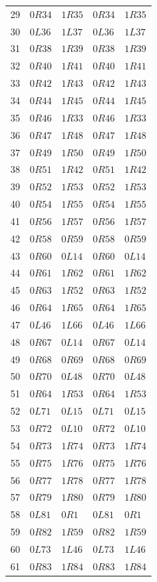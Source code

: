 {\begin{longtable}{@{}rllll@{}}
29 & $0R34$ & $1R35$ & $0R34$ & $1R35$\\
30 & $0L36$ & $1L37$ & $0L36$ & $1L37$\\
31 & $0R38$ & $1R39$ & $0R38$ & $1R39$\\
32 & $0R40$ & $1R41$ & $0R40$ & $1R41$\\
33 & $0R42$ & $1R43$ & $0R42$ & $1R43$\\
34 & $0R44$ & $1R45$ & $0R44$ & $1R45$\\
35 & $0R46$ & $1R33$ & $0R46$ & $1R33$\\
36 & $0R47$ & $1R48$ & $0R47$ & $1R48$\\
37 & $0R49$ & $1R50$ & $0R49$ & $1R50$\\
38 & $0R51$ & $1R42$ & $0R51$ & $1R42$\\
39 & $0R52$ & $1R53$ & $0R52$ & $1R53$\\
40 & $0R54$ & $1R55$ & $0R54$ & $1R55$\\
41 & $0R56$ & $1R57$ & $0R56$ & $1R57$\\
42 & $0R58$ & $0R59$ & $0R58$ & $0R59$\\
43 & $0R60$ & $0L14$ & $0R60$ & $0L14$\\
44 & $0R61$ & $1R62$ & $0R61$ & $1R62$\\
45 & $0R63$ & $1R52$ & $0R63$ & $1R52$\\
46 & $0R64$ & $1R65$ & $0R64$ & $1R65$\\
47 & $0L46$ & $1L66$ & $0L46$ & $1L66$\\
48 & $0R67$ & $0L14$ & $0R67$ & $0L14$\\
49 & $0R68$ & $0R69$ & $0R68$ & $0R69$\\
50 & $0R70$ & $0L48$ & $0R70$ & $0L48$\\
51 & $0R64$ & $1R53$ & $0R64$ & $1R53$\\
52 & $0L71$ & $0L15$ & $0L71$ & $0L15$\\
53 & $0R72$ & $0L10$ & $0R72$ & $0L10$\\
54 & $0R73$ & $1R74$ & $0R73$ & $1R74$\\
55 & $0R75$ & $1R76$ & $0R75$ & $1R76$\\
56 & $0R77$ & $1R78$ & $0R77$ & $1R78$\\
57 & $0R79$ & $1R80$ & $0R79$ & $1R80$\\
58 & $0L81$ & $0R1$ & $0L81$ & $0R1$\\
59 & $0R82$ & $1R59$ & $0R82$ & $1R59$\\
60 & $0L73$ & $1L46$ & $0L73$ & $1L46$\\
61 & $0R83$ & $1R84$ & $0R83$ & $1R84$\\

\end{longtable}}
